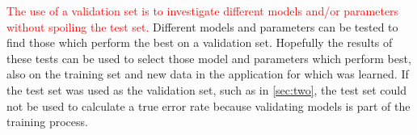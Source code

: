 \documentclass[a4paper,11pt]{article}
\newcommand{\highlightColor}{red}
\begin{document}
\begin{enumerate}
\textcolor{\highlightColor}{ 
The use of a validation set is to investigate different models and/or
parameters without spoiling the test set.}
Different models and parameters can be tested to find those which perform the best on a validation 
set.  Hopefully the results of these tests can be used to select those 
model and parameters which perform best, also on the training set and new 
data in the application for which was learned.  
If the test set was used as the validation set, such 
as in \autoref{sec:two}, the test set could not be used to calculate a 
true error rate because validating models is part of the training process.  

\end{enumerate}
\end{document}
